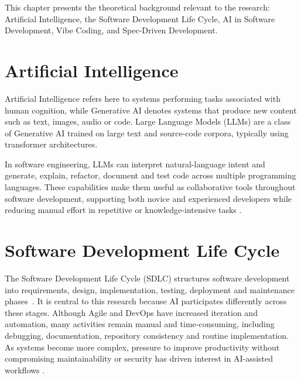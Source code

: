 \label{chap:background}

This chapter presents the theoretical background relevant to the research: Artificial Intelligence, the Software Development Life Cycle, AI in Software Development, Vibe Coding, and Spec-Driven Development.

\section{Artificial Intelligence}

Artificial Intelligence refers here to systems performing tasks associated with human cognition, while Generative AI denotes systems that produce new content such as text, images, audio or code. Large Language Models (LLMs) are a class of Generative AI trained on large text and source-code corpora, typically using transformer architectures.

In software engineering, LLMs can interpret natural-language intent and generate, explain, refactor, document and test code across multiple programming languages. These capabilities make them useful as collaborative tools throughout software development, supporting both novice and experienced developers while reducing manual effort in repetitive or knowledge-intensive tasks \cite{Ahmed:2025ai,AlHashimi:2025er,Banh:2025cf,Basha:2025tt,Chen:2025es,Durrani:2024ad,Haque:2025la,Hou:2025cl,Jabrw:2025ss,Kim:2025ao,Moore:2025vc,Terragni:2025fa,Wang:2025rs,Zhang:2025ea}.

\section{Software Development Life Cycle}

The Software Development Life Cycle (SDLC) structures software development into requirements, design, implementation, testing, deployment and maintenance phases~\cite{Ahmed:2025ai}. It is central to this research because AI participates differently across these stages. Although Agile and DevOps have increased iteration and automation, many activities remain manual and time-consuming, including debugging, documentation, repository consistency and routine implementation. As systems become more complex, pressure to improve productivity without compromising maintainability or security has driven interest in AI-assisted workflows \cite{Zhang:2025ea,Ahmed:2025ai,Jabrw:2025ss,Terragni:2025fa}.

